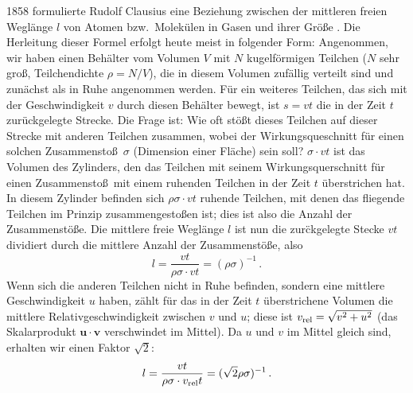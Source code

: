 1858 formulierte 
Rudolf Clausius eine Beziehung zwischen der mittleren freien Wegl\"ange $l$ von Atomen 
bzw.\ Molek\"ulen in Gasen und ihrer Gr\"o\ss e \cite{Clausius58}. Die Herleitung dieser Formel
erfolgt heute meist in folgender Form: Angenommen, wir haben einen Beh\"alter vom Volumen $V$ mit
$N$ kugelf\"ormigen Teilchen ($N$ sehr gro\ss, Teilchendichte $\rho=N/V$), die in diesem Volumen zuf\"allig 
verteilt sind und zun\"achst als in Ruhe angenommen werden. F\"ur ein weiteres Teilchen, das sich mit der 
Geschwindigkeit $v$ durch diesen Beh\"alter bewegt, ist $s=vt$ die in der Zeit $t$ zur\"uckgelegte Strecke. 
Die Frage ist: Wie oft st\"o\ss t dieses Teilchen auf 
dieser Strecke mit anderen Teilchen zusammen, wobei der Wirkungsqueschnitt f\"ur einen solchen
Zusammensto\ss\ $\sigma$ (Dimension einer Fl\"ache) sein soll? $\sigma\cdot vt$ ist das Volumen des Zylinders,
den das Teilchen mit seinem Wirkungsquerschnitt f\"ur einen Zusammensto\ss\ mit einem ruhenden Teilchen
in der Zeit $t$ \"uberstrichen hat.
In diesem Zylinder befinden sich $\rho \sigma \cdot v t$ ruhende Teilchen, mit denen das fliegende Teilchen
im Prinzip zusammengesto\ss en ist; dies ist also die Anzahl der Zusammenst\"o\ss e. Die mittlere freie
Wegl\"ange $l$ ist nun die zur\"ckgelegte Stecke $vt$ dividiert durch die mittlere Anzahl der Zusammenst\"o\ss e,
also
\begin{equation}
           l = \frac{vt}{\rho \sigma \cdot vt} = (\rho \sigma)^{-1}  \, .
\end{equation}   
Wenn sich die anderen Teilchen nicht in Ruhe befinden, sondern eine mittlere Geschwindigkeit $u$
haben, z\"ahlt f\"ur das in der Zeit $t$ \"uberstrichene Volumen die mittlere Relativgeschwindigkeit zwischen 
$v$ und $u$; diese ist $v_{\rm rel}=\sqrt{v^2+u^2}$ (das Skalarprodukt $\pmb{u} \cdot \pmb{v}$ verschwindet im Mittel). 
Da $u$ und $v$ im Mittel gleich sind, erhalten wir einen Faktor $\sqrt{2}$:
\begin{equation}
\label{eq_meanfreepath}
           l = \frac{vt}{\rho \sigma \cdot v_{\rm rel}t} = (\sqrt{2}\rho \sigma)^{-1}  \, .
\end{equation}   

